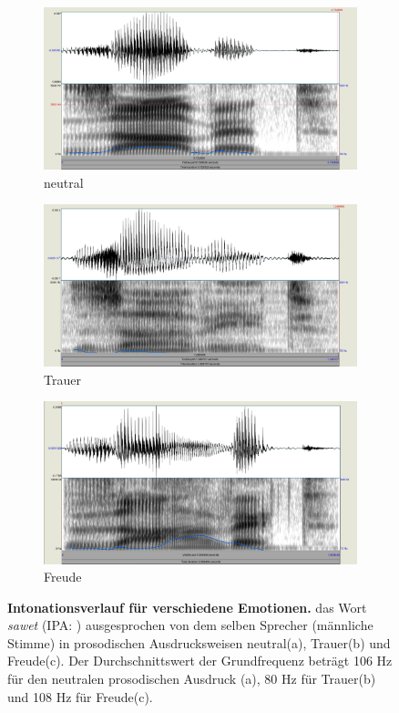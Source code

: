 \documentclass[11pt,a4paper,headsepline,twoside,toc=bibliography]{scrreprt}
\begin{document}
\begin{figure}
	\centering
	\begin{subfigure}{1\textwidth}
		\centering
		\includegraphics[width=0.8\linewidth]{pics/sawet_s.png}
		\caption{neutral}
		\label{fig:sawet_s}
	\end{subfigure}
	\par\bigskip
	\begin{subfigure}{0.8\textwidth}
		\centering
		\includegraphics[width=1\linewidth]{pics/sawet_T.png}
		\caption{Trauer}
		\label{fig:sawet_T}
	\end{subfigure}
	\par\bigskip
	\begin{subfigure}{0.8\textwidth}
		\centering
		\includegraphics[width=1\linewidth]{pics/sawet_F.png}
		\caption{Freude}
		\label{fig:sawet_F}
	\end{subfigure}
	\caption{\textbf{Intonationsverlauf für verschiedene Emotionen.} das Wort \emph{sawet} (IPA: ) ausgesprochen von dem selben Sprecher (männliche Stimme) in prosodischen Ausdrucksweisen  neutral(a), Trauer(b) und Freude(c). Der Durchschnittswert der Grundfrequenz beträgt 106 Hz für den neutralen prosodischen Ausdruck (a), 80 Hz für Trauer(b) und 108 Hz für Freude(c).}
	\label{fig:pitch_variation}
\end{figure}
\end{document}
